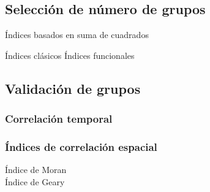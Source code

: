 \documentclass[
]{book}
\begin{document}
\hypertarget{selecciuxf3n-de-nuxfamero-de-grupos}{%
\subsection{Selección de número de grupos}\label{selecciuxf3n-de-nuxfamero-de-grupos}}

Índices basados en suma de cuadrados

Índices clásicos Índices funcionales

\hypertarget{validaciuxf3n-de-grupos}{%
\subsection{Validación de grupos}\label{validaciuxf3n-de-grupos}}

\hypertarget{correlaciuxf3n-temporal}{%
\subsubsection{Correlación temporal}\label{correlaciuxf3n-temporal}}

\hypertarget{uxedndices-de-correlaciuxf3n-espacial-1}{%
\subsubsection{Índices de correlación espacial}\label{uxedndices-de-correlaciuxf3n-espacial-1}}

Índice de Moran\\
Índice de Geary
\end{document}
